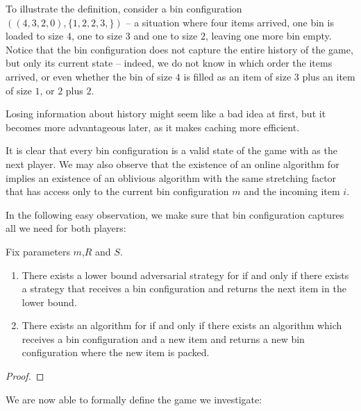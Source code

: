 To illustrate the definition, consider a bin configuration
$((4,3,2,0),\{1,2,2,3,\})$ -- a situation where four items arrived,
one bin is loaded to size $4$, one to size $3$ and one to size $2$,
leaving one more bin empty. Notice that the bin configuration does not
capture the entire history of the game, but only its current state --
indeed, we do not know in which order the items arrived, or even
whether the bin of size $4$ is filled as an item of size $3$ plus an
item of size $1$, or $2$ plus $2$.

Losing information about history might seem like a bad idea at first,
but it becomes more advantageous later, as it makes caching more
efficient.

It is clear that every bin configuration is a valid state of the game
with \adversary as the next player. We may also observe that the
existence of an online algorithm for \binstretch implies an existence
of an oblivious algorithm with the same stretching factor that has
access only to the current bin configuration $m$ and the incoming item
$i$.

In the following easy observation, we make sure that bin configuration
captures all we need for both players:

\begin{obs} Fix parameters $m$,$R$ and $S$.
\begin{enumerate}
\item There exists a lower bound adversarial strategy for \binstretch if and only if there exists a strategy
that receives a bin configuration and returns the next item in the lower bound.
\item There exists an algorithm for \binstretch if and only if there exists an algorithm which receives
a bin configuration and a new item and returns a new bin configuration where the new item is packed.
\end{enumerate}
\end{obs}
\begin{proof}
\end{proof}
We are now able to formally define the game we investigate:

